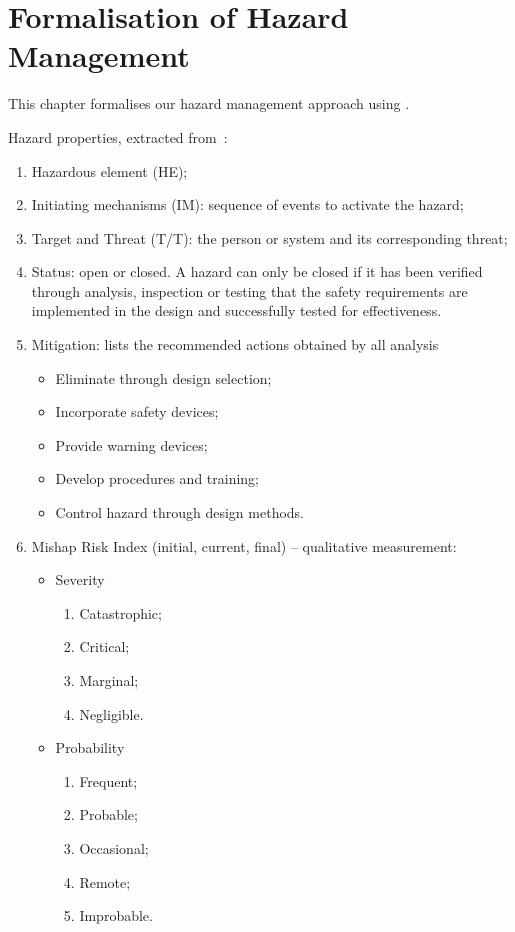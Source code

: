 \chapter{Formalisation of Hazard Management}

This chapter formalises our hazard management approach using \CSP.

Hazard properties, extracted from~\cite{EricsonII2005}:
%
\begin{enumerate}
  \item Hazardous element (HE);
  \item Initiating mechanisms (IM): sequence of events to activate the hazard;
  \item Target and Threat (T/T): the person or system and its corresponding threat;
  \item Status: open or closed. A hazard can only be closed if it has been verified through analysis, inspection or testing that the safety requirements are implemented in the design and successfully tested for effectiveness.
  \item Mitigation: lists the recommended actions obtained by all analysis
  \begin{itemize}
    \item Eliminate through design selection;
    \item Incorporate safety devices;
    \item Provide warning devices;
    \item Develop procedures and training;
    \item Control hazard through design methods.
  \end{itemize}
  \item Mishap Risk Index (initial, current, final) -- qualitative measurement:
  \begin{itemize}
    \item Severity
    \begin{enumerate}
      \item Catastrophic;
      \item Critical;
      \item Marginal;
      \item Negligible.
    \end{enumerate}
    \item Probability
    \begin{enumerate}
      \item Frequent;
      \item Probable;
      \item Occasional;
      \item Remote;
      \item Improbable.
    \end{enumerate}
  \end{itemize} 
\end{enumerate}

